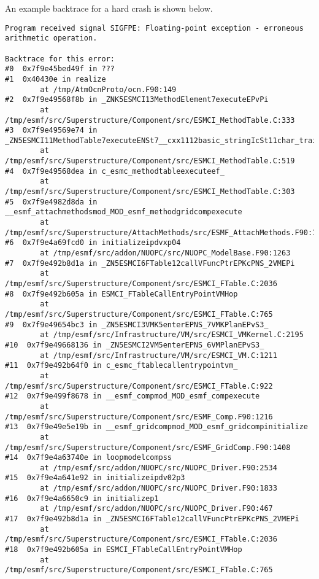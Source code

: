 An example backtrace for a hard crash is shown below.

\begin{verbatim}
Program received signal SIGFPE: Floating-point exception - erroneous arithmetic operation.

Backtrace for this error:
#0  0x7f9e45bed49f in ???
#1  0x40430e in realize
        at /tmp/AtmOcnProto/ocn.F90:149
#2  0x7f9e49568f8b in _ZNK5ESMCI13MethodElement7executeEPvPi
        at /tmp/esmf/src/Superstructure/Component/src/ESMCI_MethodTable.C:333
#3  0x7f9e49569e74 in _ZN5ESMCI11MethodTable7executeENSt7__cxx1112basic_stringIcSt11char_traitsIcESaIcEEEPvPiPb
        at /tmp/esmf/src/Superstructure/Component/src/ESMCI_MethodTable.C:519
#4  0x7f9e49568dea in c_esmc_methodtableexecuteef_
        at /tmp/esmf/src/Superstructure/Component/src/ESMCI_MethodTable.C:303
#5  0x7f9e4982d8da in __esmf_attachmethodsmod_MOD_esmf_methodgridcompexecute
        at /tmp/esmf/src/Superstructure/AttachMethods/src/ESMF_AttachMethods.F90:1278
#6  0x7f9e4a69fcd0 in initializeipdvxp04
        at /tmp/esmf/src/addon/NUOPC/src/NUOPC_ModelBase.F90:1263
#7  0x7f9e492b8d1a in _ZN5ESMCI6FTable12callVFuncPtrEPKcPNS_2VMEPi
        at /tmp/esmf/src/Superstructure/Component/src/ESMCI_FTable.C:2036
#8  0x7f9e492b605a in ESMCI_FTableCallEntryPointVMHop
        at /tmp/esmf/src/Superstructure/Component/src/ESMCI_FTable.C:765
#9  0x7f9e49654bc3 in _ZN5ESMCI3VMK5enterEPNS_7VMKPlanEPvS3_
        at /tmp/esmf/src/Infrastructure/VM/src/ESMCI_VMKernel.C:2195
#10  0x7f9e49668136 in _ZN5ESMCI2VM5enterEPNS_6VMPlanEPvS3_
        at /tmp/esmf/src/Infrastructure/VM/src/ESMCI_VM.C:1211
#11  0x7f9e492b64f0 in c_esmc_ftablecallentrypointvm_
        at /tmp/esmf/src/Superstructure/Component/src/ESMCI_FTable.C:922
#12  0x7f9e499f8678 in __esmf_compmod_MOD_esmf_compexecute
        at /tmp/esmf/src/Superstructure/Component/src/ESMF_Comp.F90:1216
#13  0x7f9e49e5e19b in __esmf_gridcompmod_MOD_esmf_gridcompinitialize
        at /tmp/esmf/src/Superstructure/Component/src/ESMF_GridComp.F90:1408
#14  0x7f9e4a63740e in loopmodelcompss
        at /tmp/esmf/src/addon/NUOPC/src/NUOPC_Driver.F90:2534
#15  0x7f9e4a641e92 in initializeipdv02p3
        at /tmp/esmf/src/addon/NUOPC/src/NUOPC_Driver.F90:1833
#16  0x7f9e4a6650c9 in initializep1
        at /tmp/esmf/src/addon/NUOPC/src/NUOPC_Driver.F90:467
#17  0x7f9e492b8d1a in _ZN5ESMCI6FTable12callVFuncPtrEPKcPNS_2VMEPi
        at /tmp/esmf/src/Superstructure/Component/src/ESMCI_FTable.C:2036
#18  0x7f9e492b605a in ESMCI_FTableCallEntryPointVMHop
        at /tmp/esmf/src/Superstructure/Component/src/ESMCI_FTable.C:765

\end{verbatim}

